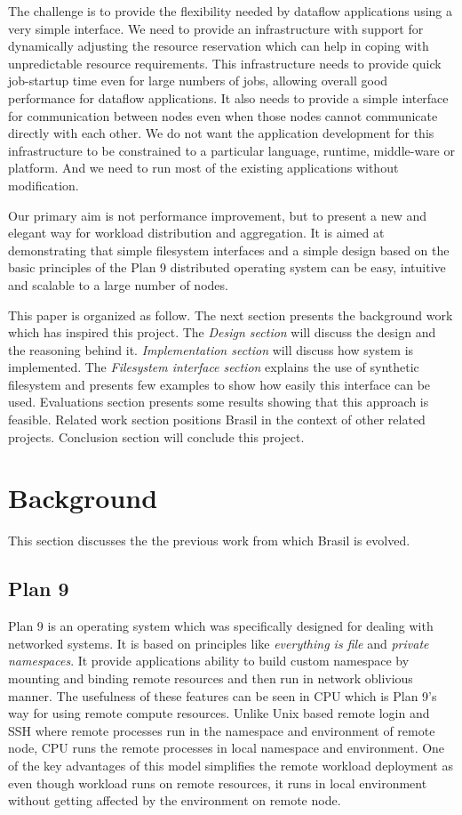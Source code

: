 \documentclass[conference]{sig-alternate}
\begin{document}
The challenge is to provide the flexibility needed by dataflow applications
using a very simple interface.  We need to provide an infrastructure with
support for dynamically adjusting the resource reservation which can help in
coping with unpredictable resource requirements.  This infrastructure needs to
provide quick job-startup time even for large numbers of jobs, allowing overall
good performance for dataflow applications.  It also needs to provide a simple
interface for communication between nodes even when those nodes cannot
communicate directly with each other. We do not want the application development
for this infrastructure to be constrained to a particular language, runtime,
middle-ware or platform.  And we need to run most of the existing applications
without modification.


Our primary aim is not performance improvement, but to present a new and elegant
way for workload distribution and aggregation.  It is aimed at demonstrating
that simple filesystem interfaces and a simple design based on the basic
principles of the Plan 9 \cite{pike95plan} distributed operating system can be
easy, intuitive and scalable to a large number of nodes.

This paper is organized as follow. The next section presents the background
work which has inspired this project. The \textit{Design section} will discuss
the design and the reasoning behind it. \textit{Implementation section} will
discuss how system is implemented. The \textit{Filesystem interface section}
explains the use of synthetic filesystem and presents few examples to show how
easily this interface can be used. Evaluations section presents some results
showing that this approach is feasible. Related work section positions Brasil in
the context of other related projects. Conclusion section will conclude this
project.

\section{Background}
This section discusses the the previous work from which Brasil is evolved.

\subsection{Plan 9}
Plan 9 is an operating system which was specifically designed for dealing with
networked systems.  It is based on principles like \textit{everything is file}
and \textit{private namespaces}\cite{namespace}.  It provide applications
ability to build custom namespace by mounting and binding remote resources and
then run in network oblivious manner.  The usefulness of these features can be
seen in CPU\cite{plan9-cpu} which is Plan 9's way for using remote compute
resources.  Unlike Unix based remote login and SSH where remote processes run
in the namespace and environment of remote node, CPU runs the remote processes
in local namespace and environment.  One of the key advantages of this model
simplifies the remote workload deployment as even though workload runs on
remote resources, it runs in local environment without getting affected by the
environment on remote node.
\end{document}
